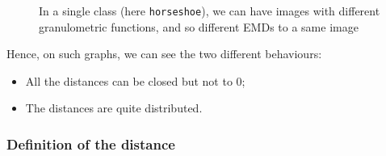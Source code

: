\begin{figure}[!ht]
    \centering
    \caption{In a single class (here \texttt{horseshoe}), we can have images with different granulometric functions, and so different EMDs to a same image} 
	\label{horseshoes}
\end{figure}

Hence, on such graphs, we can see the two different behaviours: 
\begin{itemize}
	\item All the distances can be closed but not to 0;
	\item The distances are quite distributed.
\end{itemize}

\subsubsection{Definition of the distance}

